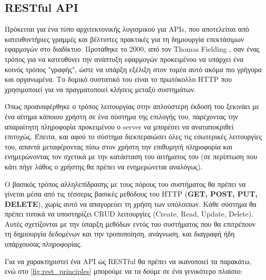 \subsection{RESTful API}
\label{subsec:rest_api}

Πρόκειται για ένα τύπο αρχιτεκτονικής λογισμικού για APIs, που αποτελείται από κατευθυντήριες γραμμές και βέλτιστες πρακτικές για τη δημιουργία επεκτάσιμων εφαρμογών στο διαδίκτυο.
Προτάθηκε το 2000, από τον Thomas Fielding \cite{rest_proposal}, σαν ένας τρόπος για να κατευθύνει την ανάπτυξη εφαρμογών 
προκειμένου να υπάρχει ένα κοινός τρόπος "γραφής", ώστε να υπάρξη εξέλιξη στον τομέα αυτό ακόμα πιο γρήγορα και οργανωμένα.  
Το δομικό συστατικό του είναι το πρωτόκολλο HTTP που χρησιμοποιεί για να πραγματοποιεί κλήσεις μεταξύ συστημάτων.

Όπως προαναφέρθηκε ο τρόπος λειτουργίας στην απλούστερη έκδοσή του ξεκινάει με ένα αίτημα κάποιου χρήστη
σε ένα σύστημα της επιλογής του, παρέχοντας την απαραίτητη πληροφορία προκειμένου ο server να μπορέσει να αναταποκριθεί επιτυχώς.
Έπειτα, και αφού το σύστημα διεκπεραιώσει όλες τις εσωτερικές λειτουργίες του, απαντά μεταφέροντας πίσω στον χρήστη
την επιθυμητή πληροφορία και ενημερώνοντας τον σχετικά με την κατάσταση του αιτήματος του (σε περίπτωση που κάτι πήγε λάθος ο χρήστης
θα πρέπει να ενημερώνεται αναλόγως).

Ο βασικός τρόπος αλληλεπίδρασης με τους πόρους του συστήματος θα πρέπει να γίνεται
μέσα από τις τέσσερις βασικές μεθόδους του HTTP (\textbf{GET, POST, PUT, DELETE}), χωρίς αυτό να απαγορεύει
τη χρήση των υπόλοιπων. Κάθε σύστημα θα πρέπει τυπικά να υποστηρίζει CRUD λειτουργίες (Create, Read, Update, Delete). Αυτές σχετίζονται
με την ύπαρξη μεθόδων εντός του συστήματος που θα επιτρέπουν τη δημιουργία δεδομένων και την τροποποίηση, ανάγνωση, και διαγραφή ήδη υπάρχουσας πληροφορίας. 

Για να χαρακτηριστεί ένα API ώς RESTful θα πρέπει να ικανοποιεί τα παρακάτω, ενώ
στο \autoref{fig:rest_principles} μπορούμε να τα δούμε σε ένα γενικότερο πλαίσιο:

